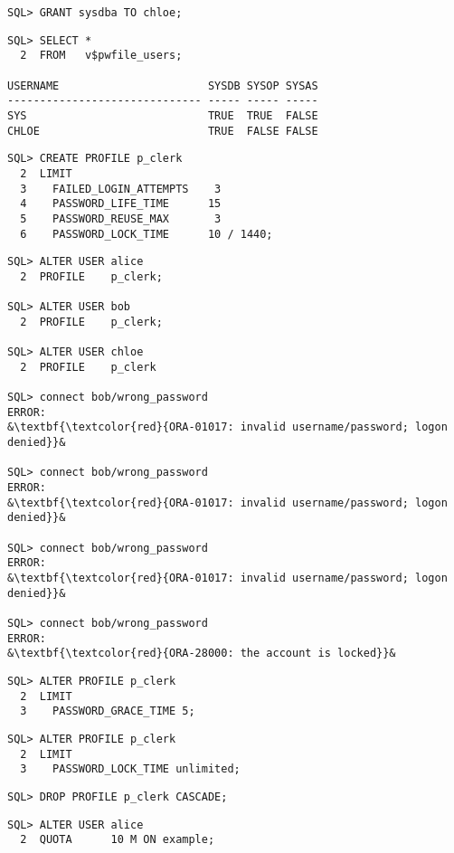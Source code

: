 \begin{enumerate}
\begin{lstlisting}[language=oracle_sql]
SQL> GRANT sysdba TO chloe;
      \end{lstlisting}
    
      \begin{lstlisting}[language=oracle_sql]
SQL> SELECT *
  2  FROM   v$pwfile_users;

USERNAME                       SYSDB SYSOP SYSAS
------------------------------ ----- ----- -----
SYS                            TRUE  TRUE  FALSE
CHLOE                          TRUE  FALSE FALSE
      \end{lstlisting}
\clearpage	  
    
      \begin{lstlisting}[language=oracle_sql]
SQL> CREATE PROFILE p_clerk
  2  LIMIT
  3    FAILED_LOGIN_ATTEMPTS    3
  4    PASSWORD_LIFE_TIME      15
  5    PASSWORD_REUSE_MAX       3
  6    PASSWORD_LOCK_TIME      10 / 1440;
      \end{lstlisting}
    
      \begin{lstlisting}[language=oracle_sql,alsolanguage=sqlplus]
SQL> ALTER USER alice
  2  PROFILE    p_clerk;

SQL> ALTER USER bob
  2  PROFILE    p_clerk;

SQL> ALTER USER chloe
  2  PROFILE    p_clerk

SQL> connect bob/wrong_password
ERROR:
&\textbf{\textcolor{red}{ORA-01017: invalid username/password; logon denied}}&

SQL> connect bob/wrong_password
ERROR:
&\textbf{\textcolor{red}{ORA-01017: invalid username/password; logon denied}}&

SQL> connect bob/wrong_password
ERROR:
&\textbf{\textcolor{red}{ORA-01017: invalid username/password; logon denied}}&

SQL> connect bob/wrong_password
ERROR:
&\textbf{\textcolor{red}{ORA-28000: the account is locked}}&
      \end{lstlisting}
\clearpage	  
    
      \begin{lstlisting}[language=oracle_sql]
SQL> ALTER PROFILE p_clerk
  2  LIMIT
  3    PASSWORD_GRACE_TIME 5;
      \end{lstlisting}
    
      \begin{lstlisting}[language=oracle_sql]
SQL> ALTER PROFILE p_clerk
  2  LIMIT
  3    PASSWORD_LOCK_TIME unlimited;
      \end{lstlisting}
    
      \begin{lstlisting}[language=oracle_sql]
SQL> DROP PROFILE p_clerk CASCADE;
      \end{lstlisting}
    
      \begin{lstlisting}[language=oracle_sql]
SQL> ALTER USER alice
  2  QUOTA      10 M ON example;


\end{lstlisting}
\end{enumerate}
